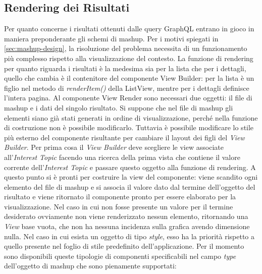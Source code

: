 \subsection{Rendering dei Risultati}\label{sec:view-risultati}
Per quanto concerne i risultati ottenuti dalle query GraphQL entrano in gioco in maniera preponderante gli schemi di mashup. Per i motivi spiegati in \ref{sec:mashup-design}, la risoluzione del problema necessita di un funzionamento più complesso rispetto alla visualizzazione del contesto. La funzione di rendering per quanto riguarda i risultati è la medesima sia per la lista che per i dettagli, quello che cambia è il contenitore del componente View Builder: per la lista è un figlio nel metodo di \emph{renderItem()} della ListView, mentre per i dettagli definisce l'intera pagina.
Al componente View Render sono necessari due oggetti: il file di mashup e i dati del singolo risultato.
Si suppone che nel file di mashup gli elementi siano già stati generati in ordine di visualizzazione, perché nella funzione di costruzione non è possibile modificarlo. Tuttavia è possibile modificare lo stile più esterno del componente risultante per cambiare il layout dei figli del \emph{View Builder}. Per prima cosa il \emph{View Builder} deve scegliere le view associate all'\emph{Interest Topic} facendo una ricerca della prima vista che contiene il valore corrente dell'\emph{Interest Topic} e passare questo oggetto alla funzione di rendering. A questo punto si è pronti per costruire la view del componente: viene scandito ogni elemento del file di mashup e si associa il valore dato dal termine dell'oggetto del risultato e viene ritornato il componente pronto per essere elaborato per la visualizzazione. Nel caso in cui non fosse presente un valore per il termine desiderato ovviamente non viene renderizzato nessun elemento, ritornando una \emph{View} base vuota, che non ha nessuna incidenza sulla grafica avendo dimensione nulla. Nel caso in cui esista un oggetto di tipo \emph{style}, esso ha la priorità rispetto a quello presente nel foglio di stile predefinito dell'applicazione. Per il momento sono disponibili queste tipologie di componenti specificabili nel campo \emph{type} dell'oggetto di mashup che sono pienamente supportati:

